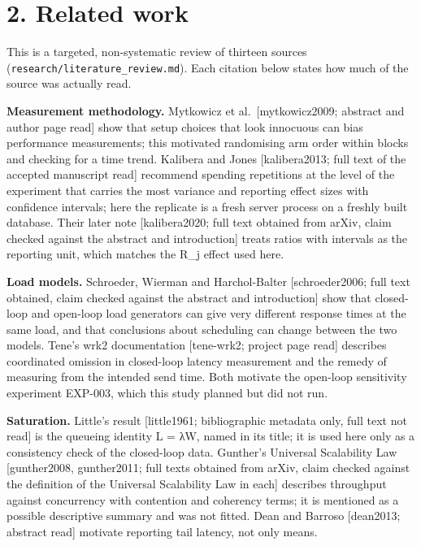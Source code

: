 \documentclass[
]{article}
\begin{document}
\section{2. Related work}\label{related-work}

This is a targeted, non-systematic review of thirteen sources
(\texttt{research/literature\_review.md}). Each citation below states
how much of the source was actually read.

\textbf{Measurement methodology.} Mytkowicz et al.~{[}mytkowicz2009;
abstract and author page read{]} show that setup choices that look
innocuous can bias performance measurements; this motivated randomising
arm order within blocks and checking for a time trend. Kalibera and
Jones {[}kalibera2013; full text of the accepted manuscript read{]}
recommend spending repetitions at the level of the experiment that
carries the most variance and reporting effect sizes with confidence
intervals; here the replicate is a fresh server process on a freshly
built database. Their later note {[}kalibera2020; full text obtained
from arXiv, claim checked against the abstract and introduction{]}
treats ratios with intervals as the reporting unit, which matches the
R\_j effect used here.

\textbf{Load models.} Schroeder, Wierman and Harchol-Balter
{[}schroeder2006; full text obtained, claim checked against the abstract
and introduction{]} show that closed-loop and open-loop load generators
can give very different response times at the same load, and that
conclusions about scheduling can change between the two models. Tene's
wrk2 documentation {[}tene-wrk2; project page read{]} describes
coordinated omission in closed-loop latency measurement and the remedy
of measuring from the intended send time. Both motivate the open-loop
sensitivity experiment EXP-003, which this study planned but did not
run.

\textbf{Saturation.} Little's result {[}little1961; bibliographic
metadata only, full text not read{]} is the queueing identity L = λW,
named in its title; it is used here only as a consistency check of the
closed-loop data. Gunther's Universal Scalability Law {[}gunther2008,
gunther2011; full texts obtained from arXiv, claim checked against the
definition of the Universal Scalability Law in each{]} describes
throughput against concurrency with contention and coherency terms; it
is mentioned as a possible descriptive summary and was not fitted. Dean
and Barroso {[}dean2013; abstract read{]} motivate reporting tail
latency, not only means.
\end{document}
